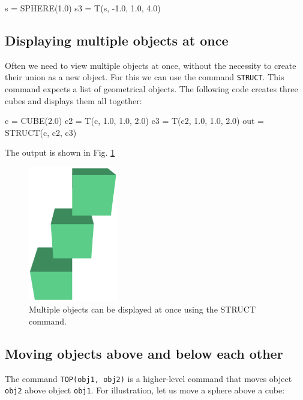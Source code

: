\begin{bluecode}
s = SPHERE(1.0)
s3 = T(s, -1.0, 1.0, 4.0)
\end{bluecode}

\subsection{Displaying multiple objects at once} \label{subsec:mo}

Often we need to view multiple objects at once, without 
the necessity to create their union as a new object. For 
this we can use the command {\tt STRUCT}. This command 
expects a list of geometrical objects. The following 
code creates three cubes and displays them all together:

\begin{bluecode}
c = CUBE(2.0)
c2 = T(c, 1.0, 1.0, 2.0)
c3 = T(c2, 1.0, 1.0, 2.0)
out = STRUCT(c, c2, c3)
\end{bluecode}
The output is shown in Fig. \ref{fig:comp-1}
\newpage
\begin{figure}[!ht]
\begin{center}
\includegraphics[width=0.35\textwidth]{img/comp-1.png}
\end{center}
\vspace{-4mm}
\caption{Multiple objects can be displayed at once using the STRUCT command.}
\label{fig:comp-1}
\end{figure}


\subsection{Moving objects above and below each other}

The command {\tt TOP(obj1, obj2)} is a higher-level command that 
moves object {\tt obj2} above object {\tt obj1}. 
For illustration, let us move a sphere above a cube:

